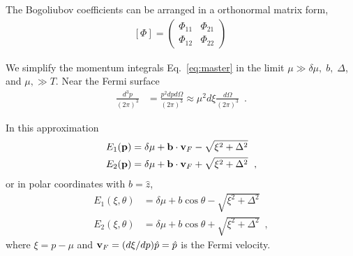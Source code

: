 \documentclass[10pt, aps, prd, superscriptaddress, nofootinbib, 
               amsmath, amssymb, twocolumn,
               preprintnumbers, showpacs,
               raggedbottom,
               floatfix]{revtex4-1}
\newcommand{\bfp}{{\bf{p}}}
\newcommand{\bfb}{{\bf{b}}}
\newcommand{\bfv}{{\bf{v}}}
\begin{document}
The Bogoliubov coefficients can be arranged in a orthonormal matrix form,
\begin{equation}
\begin{split}
[\Phi] = \left(\begin{array}{cc}\Phi_{11} & \Phi_{21}\\
    \Phi_{12} & \Phi_{22}\end{array}
\right)
~\label{eq:ortho}
\end{split}
\end{equation}


We simplify the momentum integrals Eq.~\ref{eq:master} in
the limit $\mu\gg\delta\mu,\; b,\; \Delta$, and 
$\mu, \gg T$. Near the Fermi surface 
\begin{equation}
\begin{split}
\frac{d^3p}{(2\pi)^3} &= \frac{p^2dpd\Omega}{(2\pi)^3}\approx\mu^2d\xi
\frac{d\Omega}{(2\pi)^3}~\label{eq:FermiSurface}\;.
\end{split}
\end{equation} 

In this approximation  
\begin{equation}
\begin{split}
E_1(\bfp)&=\delta\mu + \bfb\cdot\bfv_F- \sqrt{\xi^2+\Delta^2}\\
E_2(\bfp)&=\delta\mu + \bfb\cdot\bfv_F+ \sqrt{\xi^2+\Delta^2}~\label{eq:E1E2}\;,
\end{split}
\end{equation}
or in polar coordinates with $\hat{b}=\hat{z}$,
\begin{equation}
\begin{split}
E_1(\xi, \theta)&=\delta\mu + b\cos\theta - \sqrt{\xi^2+\Delta^2}\\
E_2(\xi, \theta)&=\delta\mu + b\cos\theta + \sqrt{\xi^2+\Delta^2}
~\label{eq:E1E2polar}\;,
\end{split}
\end{equation}
where $\xi=p-\mu$ and $\bfv_F=(d\xi/dp)\hat{p}=\hat{p}$ is the Fermi velocity. 
\end{document}
